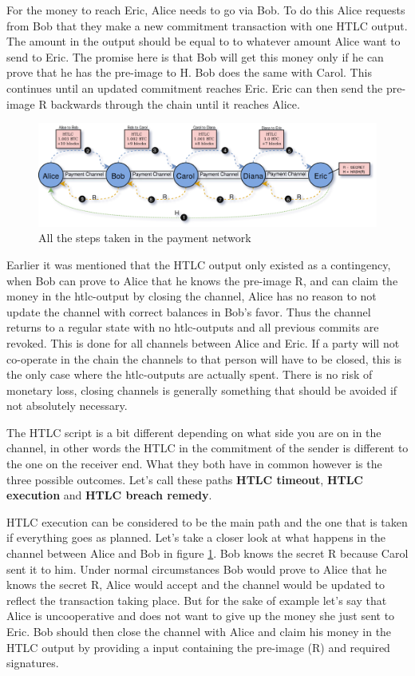 For the money to reach Eric, Alice needs to go via Bob. To do this Alice requests from Bob that they make a new commitment transaction with one HTLC output. The amount in the output should be equal to to whatever amount Alice want to send to Eric. The promise here is that Bob will get this money only if he can prove that he has the pre-image to H. Bob does the same with Carol. This continues until an updated commitment reaches Eric. Eric can then send the pre-image R backwards through the chain until it reaches Alice. 

\begin{figure}[H]
	\centering
	\includegraphics[width=1.1\textwidth]{background/images/ln_route_htlc.png}
	\caption{All the steps taken in the payment network}
	\label{fig:pc-route-final}
\end{figure}

Earlier it was mentioned that the HTLC output only existed as a contingency, when Bob can prove to Alice that he knows the pre-image R, and can claim the money in the htlc-output by closing the channel, Alice has no reason to not update the channel with correct balances in Bob's favor. Thus the channel returns to a regular state with no htlc-outputs and all previous commits are revoked. This is done for all channels between Alice and Eric. If a party will not co-operate in the chain the channels to that person will have to be closed, this is the only case where the htlc-outputs are actually spent. There is no risk of monetary loss, closing channels is generally something that should be avoided if not absolutely necessary.

The HTLC script is a bit different depending on what side you are on in the channel, in other words the HTLC in the commitment of the sender is different to the one on the receiver end. What they both have in common however is the three possible outcomes. Let's call these paths \textbf{HTLC timeout}, \textbf{HTLC execution} and \textbf{HTLC breach remedy}.

HTLC execution can be considered to be the main path and the one that is taken if everything goes as planned. Let's take a closer look at what happens in the channel between Alice and Bob in figure \ref{fig:pc-route-final}. Bob knows the secret R because Carol sent it to him. Under normal circumstances Bob would prove to Alice that he knows the secret R, Alice would accept and the channel would be updated to reflect the transaction taking place. But for the sake of example let's say that Alice is uncooperative and does not want to give up the money she just sent to Eric. 
Bob should then close the channel with Alice and claim his money in the HTLC output by providing a input containing the pre-image (R) and required signatures.


